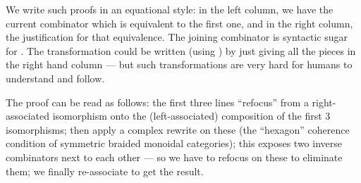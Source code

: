 \documentclass{article}
\begin{document}
We write such proofs in an equational style: in the left column, we have
the current combinator which is equivalent to the first one, and in
the right column, the justification for that equivalence. The
joining combinator is syntactic sugar for \transLR.  The transformation
could be written (using \transLR) by just giving all the pieces in
the right hand column --- but such transformations are very hard for
humans to understand and follow.

The proof
can be read as follows: the first three lines ``refocus'' from a right-associated
isomorphism onto the (left-associated) composition of the first $3$ isomorphisms;
then apply a complex rewrite on these (the ``hexagon'' coherence condition
of symmetric braided monoidal categories); this exposes two inverse combinators
next to each other --- so we have to refocus on these to eliminate them; we
finally re-associate to get the result.

\renewcommand{\AgdaIndentSpace}{\;\;}
\setlength\mathindent{0.5em}
\end{document}
